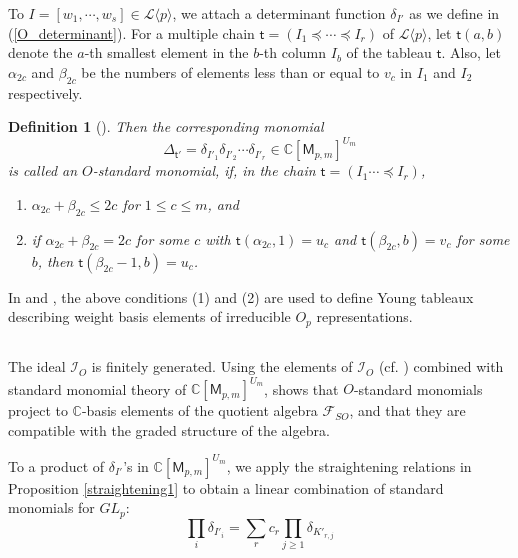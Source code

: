 \documentclass[11pt]{amsart}
\numberwithin{equation}{subsection}
\newtheorem{definition}[theorem]{Definition}
\begin{document}
\medskip

To $I=[w_{1},\cdots ,w_{s}]\in \mathcal{L}\langle p \rangle$, we attach a determinant 
function ${\delta}_{I'}$ as we define in (\ref{O_determinant}). For a multiple chain 
$\mathsf{t}=(I_{1}\preceq \cdots \preceq I_{r})$ of $\mathcal{L}\langle p \rangle$, 
let $\mathsf{t}(a,b)$ denote the $a$-th smallest element in the $b$-th column 
$I_{b}$ of the tableau $\mathsf{t}$. Also, let $\alpha _{2c}$ and 
$\beta _{2c}$ be the numbers of elements less than or equal to $v_c$ in $I_1$ and $I_2$ respectively. 

\begin{definition}[{}]\label{O-standard}
Then the corresponding monomial
\begin{equation*}
{\Delta} _{\mathsf{t}'}={\delta} _{I'_{1}} {\delta}_{I'_{2}}\cdots {\delta}_{I'_{r}}\in 
\mathbb{C}[\mathsf{M}_{p,m}]^{U_{m}}
\end{equation*}
is called an $O$-\textit{standard monomial}, if, in the chain $\mathsf{t}=(I_1 \cdots \preceq I_r)$,
\begin{enumerate}
\item $\alpha _{2c}+\beta _{2c}\leq 2c$ for $1\leq c\leq m$, and

\item if $\alpha _{2c}+\beta_{2c}=2c$ for some $c$ with 
$\mathsf{t}(\alpha _{2c},1)=u_c$ and $\mathsf{t}(\beta _{{2c}},b)=v_c$ for some $b$, then 
$\mathsf{t}(\beta_{2c} -1,b)=u_c$.
\end{enumerate}
\end{definition}
In \cite{KW93} and \cite{Pr94}, the above conditions (1) and (2) are 
used to define Young tableaux describing weight basis elements of 
irreducible $O_p$ representations.

\subsection{}\label{straightening_SO}
The ideal $\mathcal{I}_{O}$ is finitely generated. 
Using the elements of  $\mathcal{I}_{{O}}$ (cf. \cite[\S19.5]{FH91}) combined with 
standard monomial theory of
$\mathbb{C}[\mathsf{M}_{p,m}]^{U_m}$,  \cite{Ki09} shows that $O$-standard monomials project 
to $\mathbb{C}$-basis elements of the quotient algebra $\mathcal{F}_{SO}$, and that they are
compatible with the graded structure of the algebra.

\smallskip

To a product of ${\delta}_{I'}$'s in $\mathbb{C}[\mathsf{M}_{p,m}]^{U_m}$, we apply the 
straightening relations in Proposition \ref{straightening1} to obtain a linear combination 
of standard monomials for $GL_{p}$:
$$\prod_i {\delta}_{I'_i}=\sum_{r} c_{r} \prod_{j \geq 1} {\delta}_{K'_{r,j}}$$
\end{document}
